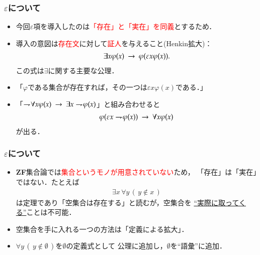 \documentclass[dvipdfmx,10pt,notheorems]{beamer}
\theoremstyle{definition}
\newcommand{\negation}{\rightharpoondown\hspace{-0.25em}} %
\newcommand{\rarrow}{\hspace{0.25em}\rightarrow\hspace{0.25em}} %
\begin{document}
\begin{frame}\frametitle{$\varepsilon$について}
	\begin{itemize}
		\item 今回$\varepsilon$項を導入したのは\textcolor{red}{「存在」と「実在」を同義}とするため．
		
			
		\item 導入の意図は\textcolor{red}{存在文}に対して\textcolor{red}{証人}を与えること(Henkin拡大)：
			\begin{align}
				\exists x \varphi(x) \rarrow \varphi(\varepsilon x \varphi(x)).
			\end{align}
			この式は$\exists$に関する主要な公理．
			
		\item 「$\varphi$である集合が存在すれば，その一つは$\varepsilon x \varphi(x)$である．」
		
		\item 「$\negation \forall x \varphi(x) \rarrow \exists x \negation \varphi(x)$」と組み合わせると
			\begin{align}
				\varphi(\varepsilon x \negation \varphi(x)) \rarrow \forall x \varphi(x)
			\end{align}
			が出る．
	\end{itemize}
\end{frame}

\begin{frame}\frametitle{$\varepsilon$について}
	\begin{itemize}
	\setlength{\itemsep}{10pt}
		\item {\bf ZF}集合論では\textcolor{red}{集合というモノが用意されていない}ため，
			「存在」は「実在」ではない．たとえば
			\begin{align}
				\exists x\, \forall y\, (\, y \notin x\, )
			\end{align}
			は定理であり「空集合は存在する」と読むが，空集合を
			\underline{``実際に取ってくる''}ことは不可能．
		
		\item 空集合を手に入れる一つの方法は「定義による拡大」．
		
		\item $\forall y\, (\, y \notin \emptyset\, )$を$\emptyset$の定義式として
			公理に追加し，$\emptyset$を``語彙''に追加．
	\end{itemize}
\end{frame}
\end{document}

